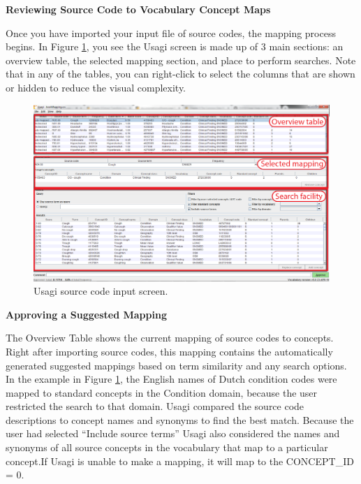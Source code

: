 \documentclass[11pt]{book}
\theoremstyle{definition}
\theoremstyle{definition}
\theoremstyle{definition}
\theoremstyle{remark}
\begin{document}
\textbf{Reviewing Source Code to Vocabulary Concept Maps}

Once you have imported your input file of source codes, the mapping process begins. In Figure \ref{fig:usagiOverview}, you see the Usagi screen is made up of 3 main sections: an overview table, the selected mapping section, and place to perform searches. Note that in any of the tables, you can right-click to select the columns that are shown or hidden to reduce the visual complexity.

\begin{figure}
\includegraphics[width=1\linewidth]{images/ExtractTransformLoad/usagiOverview} \caption{Usagi source code input screen.}\label{fig:usagiOverview}
\end{figure}

\textbf{Approving a Suggested Mapping}

The Overview Table shows the current mapping of source codes to concepts. Right after importing source codes, this mapping contains the automatically generated suggested mappings based on term similarity and any search options. In the example in Figure \ref{fig:usagiOverview}, the English names of Dutch condition codes were mapped to standard concepts in the Condition domain, because the user restricted the search to that domain. Usagi compared the source code descriptions to concept names and synonyms to find the best match. Because the user had selected ``Include source terms'' Usagi also considered the names and synonyms of all source concepts in the vocabulary that map to a particular concept.If Usagi is unable to make a mapping, it will map to the CONCEPT\_ID = 0.
\end{document}
